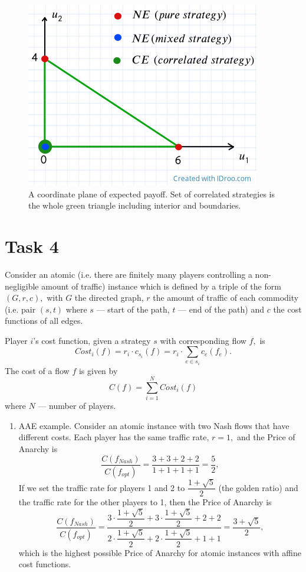 \documentclass[a4paper, 12pt]{article}
\begin{document}
\begin{figure}[H]
\centering
\includegraphics[width=\textwidth]{Images/Task3.png}
\caption{A coordinate plane of expected payoff. Set of correlated strategies is the whole green triangle including interior and boundaries.}
\end{figure}
\section{Task 4}
Consider an atomic (i.e. there
are finitely many players controlling a non-negligible amount of traffic) instance which is defined by a triple of the form $(G, r, c),$ with $G$ the directed graph, $r$ the amount of traffic of each
commodity (i.e. pair $(s, t)$ where $s$ --- start of the path, $t$ --- end of the path) and $c$ the cost functions of all edges. 

Player $i$’s cost function, given a strategy $s$ with corresponding flow $f,$ is
$$
	Cost_i(f) = r_i \cdot c_{s_i}(f) = r_i \cdot \sum \limits_{e \in s_i} c_e(f_e).
$$
The cost of a flow $f$ is given by
$$
C(f) = \sum \limits_{i=1}^N Cost_i(f)
$$
where $N$ --- number of players.
\begin{enumerate}
	\item AAE example. Consider an atomic instance with two Nash flows that have different costs. Each player
has the same traffic rate, $r = 1,$ and the Price of Anarchy is 
$$
\dfrac{C(f_{Nash})}{C(f_{opt})} = \dfrac{3 + 3 + 2 + 2}{1 + 1 + 1 + 1} = \dfrac{5}{2},
$$
 If we set the
traffic rate for players 1 and 2 to $\dfrac{1 + \sqrt{5}}{2}$ (the golden ratio) and the traffic
rate for the other players to 1, then the Price of Anarchy is 
$$
\dfrac{C(f_{Nash})}{C(f_{opt})} = \dfrac{3 \cdot \dfrac{1 + \sqrt{5}}{2} + 3 \cdot \dfrac{1 + \sqrt{5}}{2} + 2 + 2}{2 \cdot \dfrac{1 + \sqrt{5}}{2} + 2 \cdot \dfrac{1 + \sqrt{5}}{2} + 1 + 1} = \dfrac{3 + \sqrt{5}}{2},
$$ which
is the highest possible Price of Anarchy for atomic instances with affine cost functions. 
\end{enumerate}
\end{document}
